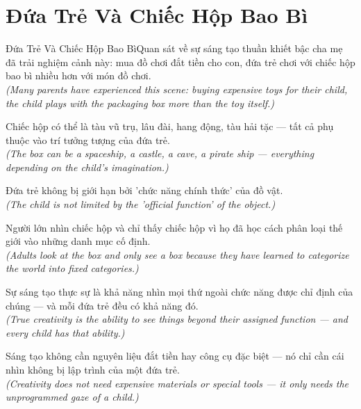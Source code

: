 \section{Đứa Trẻ Và Chiếc Hộp Bao Bì}
\begin{truyen}{Đứa Trẻ Và Chiếc Hộp Bao Bì}{Quan sát về sự sáng tạo thuần khiết}
 bậc cha mẹ đã trải nghiệm cảnh này: mua đồ chơi đắt tiền cho con, đứa trẻ chơi với chiếc hộp bao bì nhiều hơn với món đồ chơi.\\[4pt]
\textit{(Many parents have experienced this scene: buying expensive toys for their child, the child plays with the packaging box more than the toy itself.)}

Chiếc hộp có thể là tàu vũ trụ, lâu đài, hang động, tàu hải tặc --- tất cả phụ thuộc vào trí tưởng tượng của đứa trẻ.\\[4pt]
\textit{(The box can be a spaceship, a castle, a cave, a pirate ship --- everything depending on the child's imagination.)}

Đứa trẻ không bị giới hạn bởi 'chức năng chính thức' của đồ vật.\\[4pt]
\textit{(The child is not limited by the 'official function' of the object.)}

Người lớn nhìn chiếc hộp và chỉ thấy chiếc hộp vì họ đã học cách phân loại thế giới vào những danh mục cố định.\\[4pt]
\textit{(Adults look at the box and only see a box because they have learned to categorize the world into fixed categories.)}

Sự sáng tạo thực sự là khả năng nhìn mọi thứ ngoài chức năng được chỉ định của chúng --- và mỗi đứa trẻ đều có khả năng đó.\\[4pt]
\textit{(True creativity is the ability to see things beyond their assigned function --- and every child has that ability.)}

\end{truyen}
\begin{baihoc}
  Sáng tạo không cần nguyên liệu đắt tiền hay công cụ đặc biệt --- nó chỉ cần cái nhìn không bị lập trình của một đứa trẻ.\\[4pt]
  \textit{(Creativity does not need expensive materials or special tools --- it only needs the unprogrammed gaze of a child.)}
\end{baihoc}

